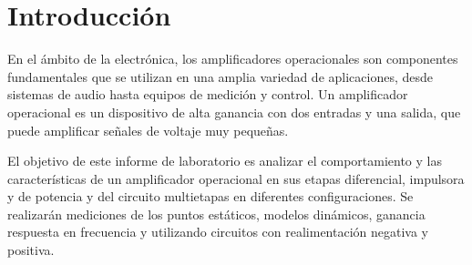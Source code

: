 \section{Introducción}

En el ámbito de la electrónica, los amplificadores operacionales son componentes fundamentales que se utilizan en una amplia variedad de aplicaciones, desde sistemas de audio hasta equipos de medición y control. Un amplificador operacional es un dispositivo de alta ganancia con dos entradas y una salida, que puede amplificar señales de voltaje muy pequeñas.

El objetivo de este informe de laboratorio es analizar el comportamiento y las características de un amplificador operacional en sus etapas diferencial, impulsora y de potencia y del circuito multietapas en diferentes configuraciones. Se realizarán mediciones de los puntos estáticos, modelos dinámicos, ganancia respuesta en frecuencia y utilizando circuitos con realimentación negativa y positiva.  

